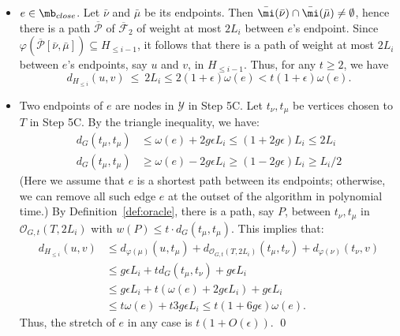 \begin{itemize}
	\item {} $e \in \mb_{close}$. Let $\bar{\nu}$ and $\bar{\mu}$ be its endpoints.  Then  $\bar{\mi}(\bar{\nu})\cap \bar{\mi}(\bar{\mu}) \not=\emptyset$, hence there is a path $\overline{\mathcal{P}}$ of $\overline{\mathcal{F}}_2$ of weight at most $2L_i$ between $e$'s endpoint.  Since $\varphi(\overline{\mathcal{P}}[\bar{\nu},\bar{\mu}]) \subseteq H_{\leq i-1}$, it follows that there is a path of weight at most $2L_i$ between  $e$'s endpoints, say $u$ and $v$, in $H_{\leq i-1}$. Thus, for any $t\geq 2$, we have
	\begin{equation}
	d_{H_{\leq i}}(u,v) ~\leq~  2L_i \leq 2(1+\epsilon)\omega(e) < t(1+\epsilon)\omega(e) .
	\end{equation}
	
	\item {} Two endpoints of $e$ are nodes in $\mathcal{Y}$ in Step 5C. Let $t_{\nu}, t_{\mu}$ be vertices chosen to $T$ in Step 5C.   By the triangle inequality, we have:
	\begin{equation}\label{eq:dist-terminals}
	\begin{split}
	d_G(t_{\mu}, t_{\mu}) &\leq \omega(e) + 2g\epsilon L_i \leq (1+2g\epsilon) L_i \leq 2L_i\\
	d_G(t_{\mu}, t_{\mu}) &\geq \omega(e) - 2g\epsilon L_i \geq (1-2g\epsilon) L_i \geq L_i/2
	\end{split}
	\end{equation}
	(Here we assume that $e$ is a shortest path between its endpoints; otherwise, we can remove all such edge $e$ at the outset of the algorithm in polynomial time.)  By Definition~\ref{def:oracle}, there is a path, say $P$, between $t_{\nu}, t_{\mu}$ in $\mathcal{O}_{G,t}(T, 2L_i)$ with $w(P)\leq t\cdot d_G(t_{\mu}, t_{\mu})$. This implies that:
	\begin{equation}\label{eq:stretch-heavy}
	\begin{split}
	d_{H_{\leq i}}(u,v) &\leq d_{\varphi(\mu)}(u,t_{\mu}) + d_{\mathcal{O}_{G,t}(T, 2L_i)}(t_{\mu}, t_{\nu}) + d_{\varphi(\nu)}(t_{\nu},v)\\
	&\leq g\epsilon L_i + t d_G(t_{\mu}, t_{\nu}) + g\epsilon L_i \\
	&\leq g\epsilon L_i + t \left(\omega(e) + 2g\epsilon L_i \right) + g\epsilon L_i \\
	&\leq t \omega(e) + t 3g\epsilon L_i \leq t(1 + 6g\epsilon) \omega(e).
	\end{split}
	\end{equation}
	Thus, the stretch of  $e$ in any case is $t(1+O(\epsilon))$. \qed
\end{itemize}

